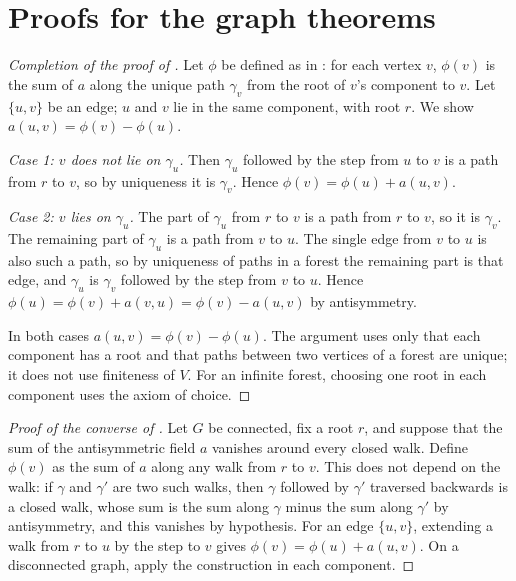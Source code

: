 \section{Proofs for the graph theorems}\label{app:graphexact}

\begin{proof}[Completion of the proof of ]
Let $\phi$ be defined as in : for each vertex $v$, $\phi(v)$ is the sum of $a$ along the unique path $\gamma_v$ from the root of $v$'s component to $v$.
Let $\{u,v\}$ be an edge; $u$ and $v$ lie in the same component, with root $r$.
We show $a(u,v)=\phi(v)-\phi(u)$.

\emph{Case 1: $v$ does not lie on $\gamma_u$.}
Then $\gamma_u$ followed by the step from $u$ to $v$ is a path from $r$ to $v$, so by uniqueness it is $\gamma_v$.
Hence $\phi(v)=\phi(u)+a(u,v)$.

\emph{Case 2: $v$ lies on $\gamma_u$.}
The part of $\gamma_u$ from $r$ to $v$ is a path from $r$ to $v$, so it is $\gamma_v$.
The remaining part of $\gamma_u$ is a path from $v$ to $u$.
The single edge from $v$ to $u$ is also such a path, so by uniqueness of paths in a forest the remaining part is that edge, and $\gamma_u$ is $\gamma_v$ followed by the step from $v$ to $u$.
Hence $\phi(u)=\phi(v)+a(v,u)=\phi(v)-a(u,v)$ by antisymmetry.

In both cases $a(u,v)=\phi(v)-\phi(u)$.
The argument uses only that each component has a root and that paths between two vertices of a forest are unique; it does not use finiteness of $V$.
For an infinite forest, choosing one root in each component uses the axiom of choice.
\end{proof}

\begin{proof}[Proof of the converse of ]
Let $G$ be connected, fix a root $r$, and suppose that the sum of the antisymmetric field $a$ vanishes around every closed walk.
Define $\phi(v)$ as the sum of $a$ along any walk from $r$ to $v$.
This does not depend on the walk: if $\gamma$ and $\gamma'$ are two such walks, then $\gamma$ followed by $\gamma'$ traversed backwards is a closed walk, whose sum is the sum along $\gamma$ minus the sum along $\gamma'$ by antisymmetry, and this vanishes by hypothesis.
For an edge $\{u,v\}$, extending a walk from $r$ to $u$ by the step to $v$ gives $\phi(v)=\phi(u)+a(u,v)$.
On a disconnected graph, apply the construction in each component.
\end{proof}
